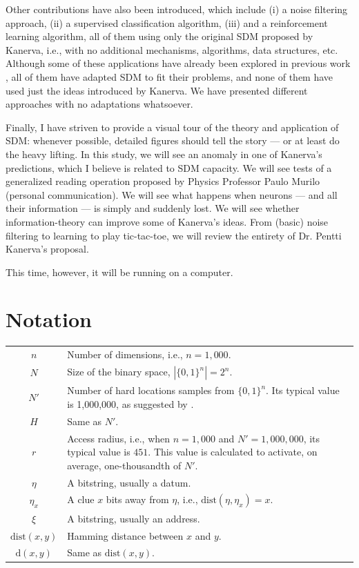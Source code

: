 Other contributions have also been introduced, which include (i) a noise filtering approach, (ii) a supervised classification algorithm, (iii) and a reinforcement learning algorithm, all of them using only the original SDM proposed by Kanerva, i.e., with no additional mechanisms, algorithms, data structures, etc. Although some of these applications have already been explored in previous work \citep{Meng2009, fan1997genetic, rao1995natural}, all of them have adapted SDM to fit their problems, and none of them have used just the ideas introduced by Kanerva. We have presented different approaches with no adaptations whatsoever.

Finally, I have striven to provide a visual tour of the theory and application of SDM: whenever possible, detailed figures should tell the story --- or at least do the heavy lifting. In this study, we will see an anomaly in one of Kanerva's predictions, which I believe is related to SDM capacity. We will see tests of a generalized reading operation proposed by Physics Professor Paulo Murilo (personal communication).  We will see what happens when neurons --- and
all their information --- is simply and suddenly lost.  We will see whether information-theory can improve some of Kanerva's ideas.  From (basic) noise filtering to learning to play tic-tac-toe, we will review the entirety of Dr. Pentti Kanerva's proposal.

This time, however, it will be running on a computer.

\chapter{Notation}

\begin{tabular}{cp{\textwidth}}
  $n$ & Number of dimensions, i.e., $n=1,000$. \\
  $N$ & Size of the binary space, $|\{0, 1\}^n| = 2^n$. \\
  $N'$ & Number of hard locations samples from $\{0, 1\}^n$. Its typical value is 1,000,000, as suggested by \citet{Kanerva1988}. \\
  $H$ & Same as $N'$. \\
  $r$ & Access radius, i.e., when $n=1,000$ and $N'=1,000,000$, its typical value is $451$. This value is calculated to activate, on average, one-thousandth of $N'$. \\
  $\eta$ & A bitstring, usually a datum. \\
  $\eta_x$ & A clue $x$ bits away from $\eta$, i.e., $\text{dist}(\eta, \eta_x) = x$. \\
  $\xi$ & A bitstring, usually an address. \\
  $\text{dist}(x, y)$ & Hamming distance between $x$ and $y$. \\
  $\text{d}(x, y)$ & Same as $\text{dist}(x, y)$.
\end{tabular}\\

